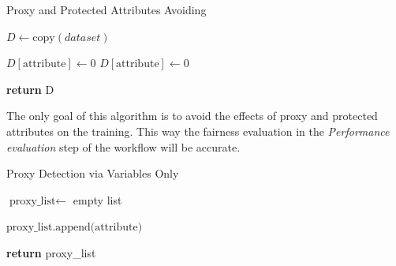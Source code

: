 \documentclass[12pt,a4paper,openright,twoside]{book}
\begin{document}
\begin{algorithm}[H]
    \caption{Proxy and Protected Attributes Avoiding}
    \label{alg:proxy_protected_attributes_avoiding}
    \begin{algorithmic}[1]
        
        \State $D \gets \text{copy}(dataset)$
        
                \State $D[\text{attribute}] \gets 0$ 
            \EndIf
                \State $D[\text{attribute}] \gets 0$
            \EndIf
        \EndFor
        
        \State \textbf{return} D
    \end{algorithmic}
\end{algorithm}

The only goal of this algorithm is to avoid the effects of proxy and protected attributes on the training. This way the fairness evaluation in the \emph{Performance evaluation} step of the workflow will be accurate.


\begin{algorithm}[H]
    \caption{Proxy Detection via Variables Only}
    \label{alg:proxy_detection_variables_only}
    \begin{algorithmic}[1]
        
        \State $\text{proxy\_list} \gets$ empty list\;
        
                    \State $\text{proxy\_list.append(attribute)}$
                \EndIf
            \EndFor
        \EndFor
        
        \State \textbf{return} proxy\_list
    \end{algorithmic}
\end{algorithm}
\end{document}

